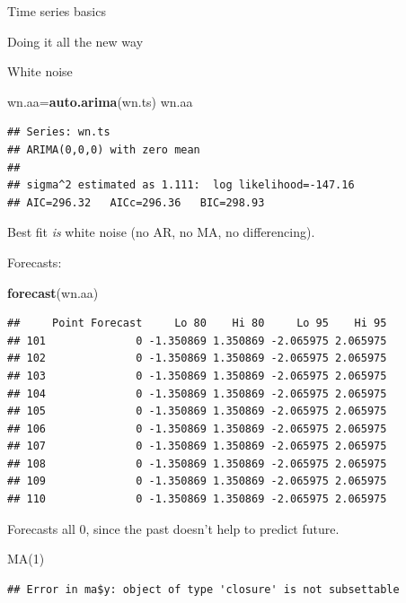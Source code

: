 \documentclass[ignorenonframetext,]{beamer}
\newenvironment{Shaded}{\begin{snugshade}}{\end{snugshade}}
\newcommand{\KeywordTok}[1]{\textcolor[rgb]{0.13,0.29,0.53}{\textbf{#1}}}
\newcommand{\NormalTok}[1]{#1}
\newcommand{\OperatorTok}[1]{\textcolor[rgb]{0.81,0.36,0.00}{\textbf{#1}}}
\begin{document}
\begin{frame}[fragile]{Time series basics}
\begin{block}{Doing it all the new way}
\begin{block}{White noise}
\begin{Shaded}
\begin{Highlighting}[]
\NormalTok{wn.aa=}\KeywordTok{auto.arima}\NormalTok{(wn.ts)}
\NormalTok{wn.aa}
\end{Highlighting}
\end{Shaded}

\begin{verbatim}
## Series: wn.ts 
## ARIMA(0,0,0) with zero mean 
## 
## sigma^2 estimated as 1.111:  log likelihood=-147.16
## AIC=296.32   AICc=296.36   BIC=298.93
\end{verbatim}

Best fit \emph{is} white noise (no AR, no MA, no differencing).

Forecasts:

\begin{Shaded}
\begin{Highlighting}[]
\KeywordTok{forecast}\NormalTok{(wn.aa)}
\end{Highlighting}
\end{Shaded}

\begin{verbatim}
##     Point Forecast     Lo 80    Hi 80     Lo 95    Hi 95
## 101              0 -1.350869 1.350869 -2.065975 2.065975
## 102              0 -1.350869 1.350869 -2.065975 2.065975
## 103              0 -1.350869 1.350869 -2.065975 2.065975
## 104              0 -1.350869 1.350869 -2.065975 2.065975
## 105              0 -1.350869 1.350869 -2.065975 2.065975
## 106              0 -1.350869 1.350869 -2.065975 2.065975
## 107              0 -1.350869 1.350869 -2.065975 2.065975
## 108              0 -1.350869 1.350869 -2.065975 2.065975
## 109              0 -1.350869 1.350869 -2.065975 2.065975
## 110              0 -1.350869 1.350869 -2.065975 2.065975
\end{verbatim}

Forecasts all 0, since the past doesn't help to predict future.

\end{block}

\begin{block}{MA(1)}

\begin{Shaded}
\end{Shaded}

\begin{verbatim}
## Error in ma$y: object of type 'closure' is not subsettable
\end{verbatim}


\end{block}
\end{block}
\end{frame}
\end{document}
